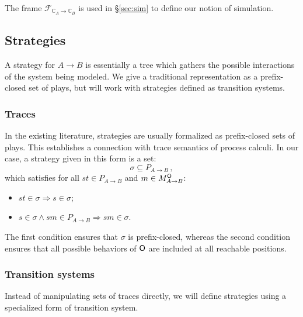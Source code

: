 The frame $\mathcal{F}_{\mathbb{C}_A \rightarrow \mathbb{C}_B}$
is used in \S\ref{sec:sim}
to define our notion of simulation.



\subsection{Strategies} %

A strategy for $A \rightarrow B$
is essentially a tree
which gathers the possible interactions of
the system being modeled.
We give a traditional representation
as a prefix-closed set of plays,
but will work with strategies defined as transition systems.

\subsubsection{Traces} %

In the existing literature,
strategies are usually formalized as prefix-closed sets of plays.
This establishes a connection with trace semantics of process calculi.
In our case,
a strategy given in this form is a set:
\[ \sigma \subseteq P_{A \rightarrow B} \,, \]
which satisfies
for all $st \in P_{A \rightarrow B}$
and $m \in M_{A \rightarrow B}^{ \mathsf{O} }$:
\begin{itemize}
  \item $st \in \sigma \Rightarrow s \in \sigma$;
  \item $s \in \sigma \wedge sm \in P_{A \rightarrow B}
    \Rightarrow sm \in \sigma$.
\end{itemize}
The first condition ensures that $\sigma$ is prefix-closed,
whereas the second condition ensures that
all possible behaviors of $ \mathsf{O} $ are included
at all reachable positions.


\subsubsection{Transition systems} %

Instead of manipulating sets of traces directly,
we will define strategies using a specialized form of transition system.

